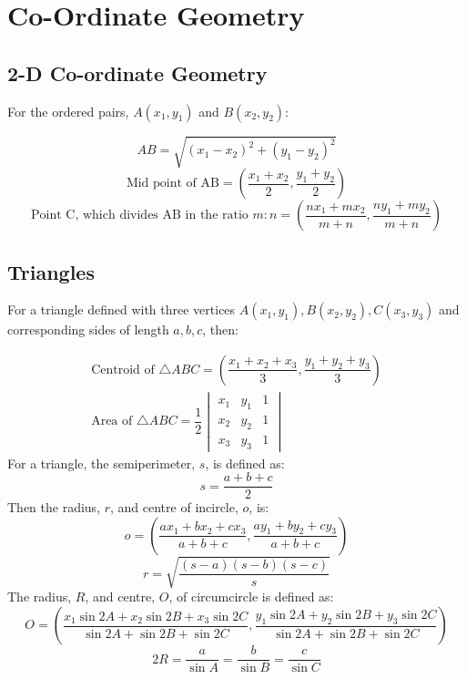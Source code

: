 \documentclass[openany, oneside]{book}
\begin{document}

\part{Co-Ordinate Geometry}
\large{\chapter{2-D Co-ordinate Geometry}}
For the ordered pairs, $A(x_1,y_1)$ and $B(x_2,y_2)$:

\begin{equation}
AB = \sqrt{(x_1-x_2)^2+(y_1-y_2)^2}
\end{equation}
\begin{equation}
\text{Mid point of AB} = (\dfrac{x_1+x_2}{2},\dfrac{y_1+y_2}{2})
\end{equation}
\begin{equation}
\text{Point C, which divides AB in the ratio }m:n = (\dfrac{nx_1+mx_2}{m+n},\dfrac{ny_1+my_2}{m+n})
\end{equation}

\large{\chapter{Triangles}}
For a triangle defined with three vertices $A(x_1,y_1),B(x_2,y_2),C(x_3,y_3)$ and corresponding sides of length $a,b,c$, then:

\begin{align}
\text{Centroid of }\triangle ABC=(\dfrac{x_1+x_2+x_3}{3},\dfrac{y_1+y_2+y_3}{3})\\
\text{Area of }\triangle ABC=\dfrac{1}{2}\begin{vmatrix}x_1&y_1&1\\x_2&y_2&1\\x_3&y_3&1\end{vmatrix}
\end{align}
For a triangle, the semiperimeter, $s$, is defined as:
\begin{equation}
s=\dfrac{a+b+c}{2}\nonumber
\end{equation}
Then the radius, $r$, and centre of incircle, $o$, is:
\begin{equation}
o=\left(\dfrac{ax_1+bx_2+cx_3}{a+b+c},\dfrac{ay_1+by_2+cy_3}{a+b+c}\right)
\end{equation}
\begin{equation}
r=\sqrt{\dfrac{(s-a)(s-b)(s-c)}{s}}
\end{equation}
The radius, $R$, and centre, $O$, of circumcircle is defined as:
\begin{equation}
O = \left( \dfrac{x_1 \sin 2A + x_2 \sin 2B + x_3 \sin 2C}{\sin 2A + \sin 2B + \sin 2C}, \dfrac{y_1 \sin 2A + y_2 \sin 2B + y_3 \sin 2C}{\sin 2A + \sin 2B + \sin 2C} \right)
\end{equation}
\begin{equation}
2R = \dfrac{a}{\sin A} = \dfrac{b}{\sin B} = \dfrac{c}{\sin C}
\end{equation}
\end{document}
